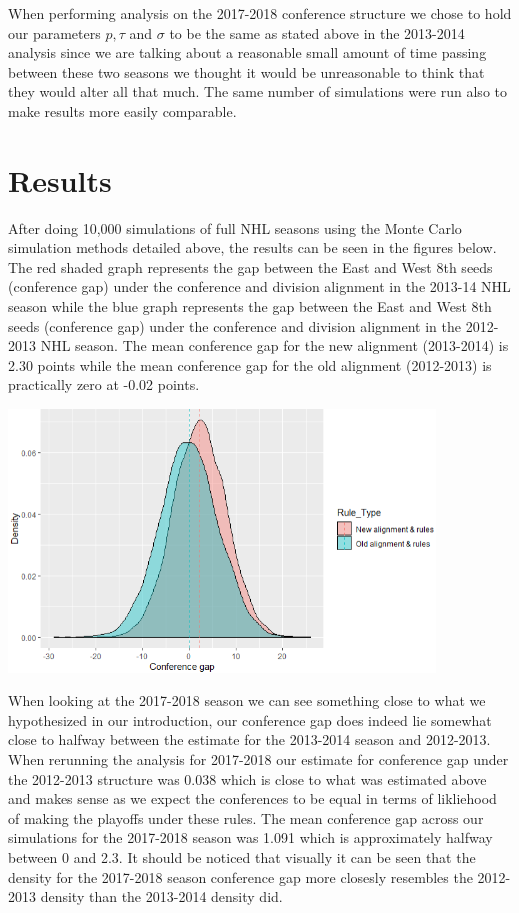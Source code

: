 \documentclass[
]{article}
\begin{document}
When performing analysis on the 2017-2018 conference structure we chose
to hold our parameters \(p,\tau\) and \(\sigma\) to be the same as
stated above in the 2013-2014 analysis since we are talking about a
reasonable small amount of time passing between these two seasons we
thought it would be unreasonable to think that they would alter all that
much. The same number of simulations were run also to make results more
easily comparable.

\hypertarget{results}{%
\section{Results}\label{results}}

After doing 10,000 simulations of full NHL seasons using the Monte Carlo
simulation methods detailed above, the results can be seen in the
figures below. The red shaded graph represents the gap between the East
and West 8th seeds (conference gap) under the conference and division
alignment in the 2013-14 NHL season while the blue graph represents the
gap between the East and West 8th seeds (conference gap) under the
conference and division alignment in the 2012-2013 NHL season. The mean
conference gap for the new alignment (2013-2014) is 2.30 points while
the mean conference gap for the old alignment (2012-2013) is practically
zero at -0.02 points.

\includegraphics[width=0.85\textwidth,height=\textheight]{Images/GapVis.png}

When looking at the 2017-2018 season we can see something close to what
we hypothesized in our introduction, our conference gap does indeed lie
somewhat close to halfway between the estimate for the 2013-2014 season
and 2012-2013. When rerunning the analysis for 2017-2018 our estimate
for conference gap under the 2012-2013 structure was 0.038 which is
close to what was estimated above and makes sense as we expect the
conferences to be equal in terms of likliehood of making the playoffs
under these rules. The mean conference gap across our simulations for
the 2017-2018 season was 1.091 which is approximately halfway between 0
and 2.3. It should be noticed that visually it can be seen that the
density for the 2017-2018 season conference gap more closesly resembles
the 2012-2013 density than the 2013-2014 density did.
\end{document}
